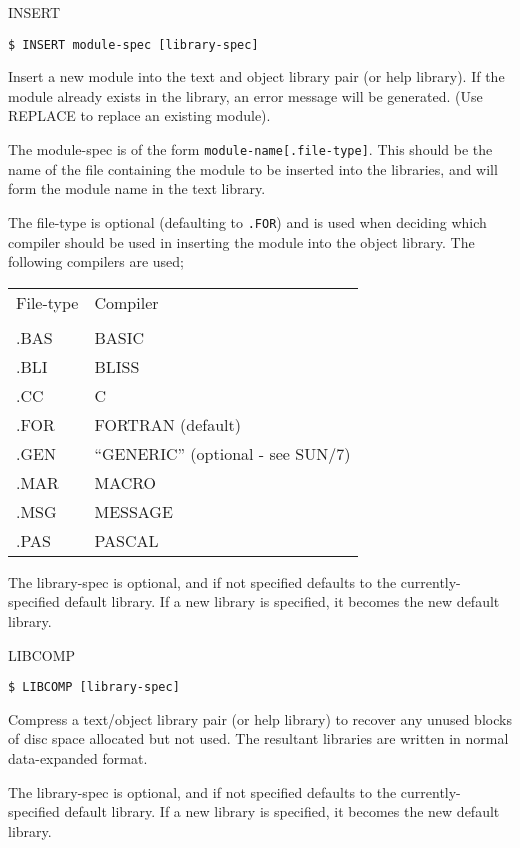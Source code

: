 \begin{list}{}{\setlength{\labelwidth}{\numlen}\setlength{\leftmargin}{\numlen}
\addtolength{\leftmargin}{\labelsep}}
\item[INSERT]
\begin{verbatim}
$ INSERT module-spec [library-spec]
\end{verbatim}
Insert a new module into the text and object library
pair (or help library).
If the module already exists in the library, an error message
will be generated.
(Use REPLACE to replace an existing module).

The module-spec is of the form {\tt module-name[.file-type]}.
This should be the name of the file containing the module to be inserted
into the libraries, and will form the module name in the text library.

The file-type is optional (defaulting to {\tt .FOR}) and is used when
deciding which compiler should be used in inserting the module into the
object library.
The following compilers are used;
\begin{center}
\begin{tabular}{ll}
        File-type &      Compiler \\
\\
        .BAS      &      BASIC \\
        .BLI      &      BLISS \\
        .CC       &      C \\
        .FOR      &      FORTRAN (default) \\
        .GEN      &      ``GENERIC'' (optional - see SUN/7) \\
        .MAR      &      MACRO \\
        .MSG      &      MESSAGE \\
        .PAS      &      PASCAL \\
\end{tabular}
\end{center}
The library-spec is optional, and if not specified defaults to the
currently-specified default library.
If a new library is specified, it becomes the new default library.

\item[LIBCOMP]
\begin{verbatim}
$ LIBCOMP [library-spec]
\end{verbatim}
Compress a text/object library pair (or help library) to recover
any unused blocks of disc space allocated but not used.
The resultant libraries are written in normal data-expanded format.

The library-spec is optional, and if not specified defaults to the
currently-specified default library.
If a new library is specified, it becomes the new default library.


\end{list}
